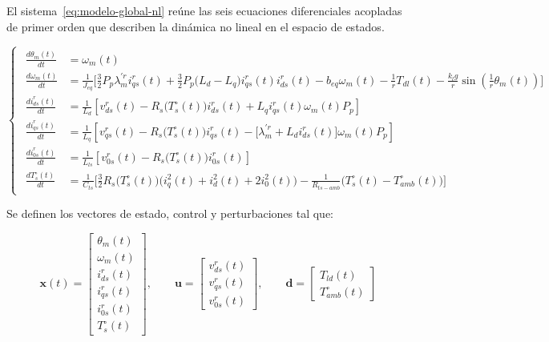 \documentclass[blue,fullpaper]{ludusofficial}  %
\begin{document}
El sistema~\eqref{eq:modelo-global-nl} reúne las seis ecuaciones diferenciales acopladas de primer orden que describen la dinámica no lineal en el espacio de estados.

\begin{equation}
\label{eq:modelo-global-nl}
    \begin{cases} %
    \begin{aligned}
        \frac{d\theta_m(t)}{dt} & = \omega_m(t) \\
        \frac{d\omega_{m}(t)}{dt} & = \frac{1}{J_{eq}} \Bigg[ \frac{3}{2}P_{p} \lambda_{m}^{'r} i_{qs}^{r}(t) + \frac{3}{2} P_{p} \Big( L_{d} - L_{q} \Big) i_{qs}^{r}(t) i_{ds}^{r}(t) - b_{eq}  \omega_{m}(t)   - \frac{1}{r} T_{dl}(t) - \frac{k_{l}g}{r} \sin \left(  \frac{1}{r} \theta_{m}(t) \right) \Bigg]  \\
        \frac{di_{ds}^{r}(t)}{dt} & = \frac{1}{L_{d}} \left[ v_{ds}^{r}(t) - R_{s} \Big( T_{s}^{\circ} (t) \Big) i_{ds}^{r}(t) + L_{q}i_{qs}^{r}(t) \omega_{m}(t)P_{p}  \right]  \\
        \frac{di_{qs}^{r}(t)}{dt} &   = \frac{1}{L_{q} } \left[ v_{qs}^{r}(t) - R_{s} \Big( T_{s}^{\circ} (t) \Big) i_{qs}^{r}(t) - \big[ \lambda_{m}^{'r} + L_{d} i_{ds}^{r}(t) \big] \omega_{m}(t)P_{p} \right]  \\
        \frac{di_{0s}^{r}(t)}{dt} & = \frac{1}{ L_{ls} } \left[ v_{0s}^{r}(t) - R_{s} \Big( T_{s}^{\circ} (t) \Big) i_{0s}^{r}(t) \right] \\
        \frac{dT_{s}^{\circ}(t)}{dt} & = \frac{1}{C_{ts}} \Bigg[ \frac{3}{2} R_{s}\Big( T_{s}^{\circ}(t) \Big) \Big( i_{q}^{2}(t) + i_{d}^{2}(t) + 2i_{0}^{2}(t) \Big) - \frac{1}{R_{ts-amb}} \Big( T_{s}^{\circ}(t) - T_{amb}^{\circ}(t) \Big) \Bigg]
    \end{aligned}
    \end{cases}
\end{equation}

Se definen los vectores de estado, control y perturbaciones tal que:

\begin{equation}
\label{eq:vectores-globales}
    \mathbf{x}(t)= \begin{bmatrix} \theta_{m}(t) \\ \omega_{m}(t) \\ i_{ds}^{r}(t) \\ i_{qs}^{r}(t) \\ i_{0s}^{r}(t) \\ T_{s}^{\circ}(t) \end{bmatrix}, \qquad \mathbf{u}=\begin{bmatrix} v_{ds}^{r}(t) \\ v_{qs}^{r}(t) \\ v_{0s}^{r}(t) \end{bmatrix}, \qquad \mathbf{d} = \begin{bmatrix} T_{ld}(t) \\ T_{amb}^{\circ}(t)  \end{bmatrix}
\end{equation}
\end{document}
